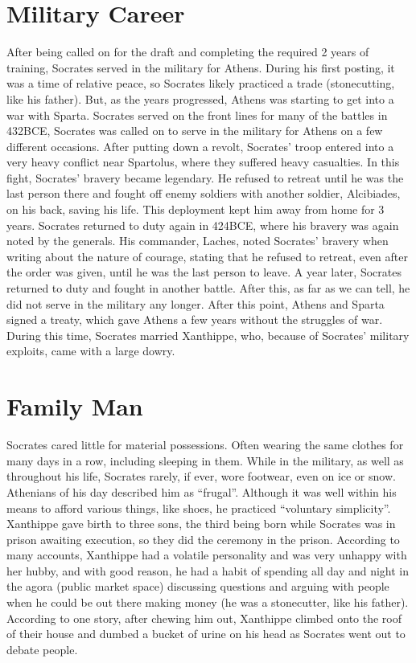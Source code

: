\section{Military Career}

After being called on for the draft and completing the required 2 years of training, Socrates served in the military for Athens. During his first posting, it was a time of relative peace, so Socrates likely practiced a trade (stonecutting, like his father). But, as the years progressed, Athens was starting to get into a war with Sparta. Socrates served on the front lines for many of the battles in 432BCE,  Socrates was called on to serve in the military for Athens on a few different occasions. After putting down a revolt, Socrates' troop entered into a very heavy conflict near Spartolus, where they suffered heavy casualties. In this fight, Socrates' bravery became legendary. He refused to retreat until he was the last person there and fought off enemy soldiers with another soldier, Alcibiades, on his back, saving his life. This deployment kept him away from home for 3 years. Socrates returned to duty again in 424BCE, where his bravery was again noted by the generals. His commander, Laches, noted Socrates' bravery when writing about the nature of courage, stating that he refused to retreat, even after the order was given, until he was the last person to leave. A year later, Socrates returned to duty and fought in another battle. After this, as far as we can tell, he did not serve in the military any longer. After this point, Athens and Sparta signed a treaty, which gave Athens a few years without the struggles of war. During this time, Socrates married Xanthippe, who, because of Socrates' military exploits, came with a large dowry.
\section{Family Man}

Socrates cared little for material possessions. Often wearing the same clothes for many days in a row, including sleeping in them. While in the military, as well as throughout his life, Socrates rarely, if ever, wore footwear, even on ice or snow. Athenians of his day described him as “frugal”. Although it was well within his means to afford various things, like shoes, he practiced “voluntary simplicity”. Xanthippe gave birth to three sons, the third being born while Socrates was in prison awaiting execution, so they did the ceremony in the prison. According to many accounts, Xanthippe had a volatile personality and was very unhappy with her hubby, and with good reason, he had a habit of spending all day and night in the agora (public market space) discussing questions and arguing with people when he could be out there making money (he was a stonecutter, like his father). According to one story, after chewing him out, Xanthippe climbed onto the roof of their house and dumbed a bucket of urine on his head as Socrates went out to debate people.


